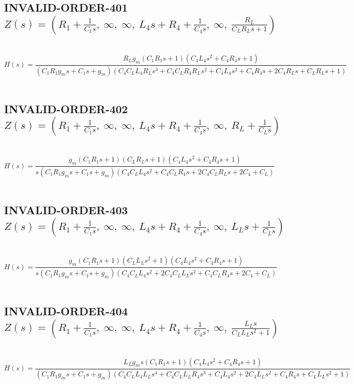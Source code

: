 \documentclass{article}
\begin{document}
\subsection{INVALID-ORDER-401 $Z(s) = \left( R_{1} + \frac{1}{C_{1} s}, \  \infty, \  \infty, \  L_{4} s + R_{4} + \frac{1}{C_{4} s}, \  \infty, \  \frac{R_{L}}{C_{L} R_{L} s + 1}\right)$ } \ 
\textbf{\[H(s) = \frac{R_{L} g_{m} \left(C_{1} R_{1} s + 1\right) \left(C_{4} L_{4} s^{2} + C_{4} R_{4} s + 1\right)}{\left(C_{1} R_{1} g_{m} s + C_{1} s + g_{m}\right) \left(C_{4} C_{L} L_{4} R_{L} s^{3} + C_{4} C_{L} R_{4} R_{L} s^{2} + C_{4} L_{4} s^{2} + C_{4} R_{4} s + 2 C_{4} R_{L} s + C_{L} R_{L} s + 1\right)}\] } \ 
\subsection{INVALID-ORDER-402 $Z(s) = \left( R_{1} + \frac{1}{C_{1} s}, \  \infty, \  \infty, \  L_{4} s + R_{4} + \frac{1}{C_{4} s}, \  \infty, \  R_{L} + \frac{1}{C_{L} s}\right)$ } \ 
\textbf{\[H(s) = \frac{g_{m} \left(C_{1} R_{1} s + 1\right) \left(C_{L} R_{L} s + 1\right) \left(C_{4} L_{4} s^{2} + C_{4} R_{4} s + 1\right)}{s \left(C_{1} R_{1} g_{m} s + C_{1} s + g_{m}\right) \left(C_{4} C_{L} L_{4} s^{2} + C_{4} C_{L} R_{4} s + 2 C_{4} C_{L} R_{L} s + 2 C_{4} + C_{L}\right)}\] } \ 
\subsection{INVALID-ORDER-403 $Z(s) = \left( R_{1} + \frac{1}{C_{1} s}, \  \infty, \  \infty, \  L_{4} s + R_{4} + \frac{1}{C_{4} s}, \  \infty, \  L_{L} s + \frac{1}{C_{L} s}\right)$ } \ 
\textbf{\[H(s) = \frac{g_{m} \left(C_{1} R_{1} s + 1\right) \left(C_{L} L_{L} s^{2} + 1\right) \left(C_{4} L_{4} s^{2} + C_{4} R_{4} s + 1\right)}{s \left(C_{1} R_{1} g_{m} s + C_{1} s + g_{m}\right) \left(C_{4} C_{L} L_{4} s^{2} + 2 C_{4} C_{L} L_{L} s^{2} + C_{4} C_{L} R_{4} s + 2 C_{4} + C_{L}\right)}\] } \ 
\subsection{INVALID-ORDER-404 $Z(s) = \left( R_{1} + \frac{1}{C_{1} s}, \  \infty, \  \infty, \  L_{4} s + R_{4} + \frac{1}{C_{4} s}, \  \infty, \  \frac{L_{L} s}{C_{L} L_{L} s^{2} + 1}\right)$ } \ 
\textbf{\[H(s) = \frac{L_{L} g_{m} s \left(C_{1} R_{1} s + 1\right) \left(C_{4} L_{4} s^{2} + C_{4} R_{4} s + 1\right)}{\left(C_{1} R_{1} g_{m} s + C_{1} s + g_{m}\right) \left(C_{4} C_{L} L_{4} L_{L} s^{4} + C_{4} C_{L} L_{L} R_{4} s^{3} + C_{4} L_{4} s^{2} + 2 C_{4} L_{L} s^{2} + C_{4} R_{4} s + C_{L} L_{L} s^{2} + 1\right)}\] } \ 
\end{document}
